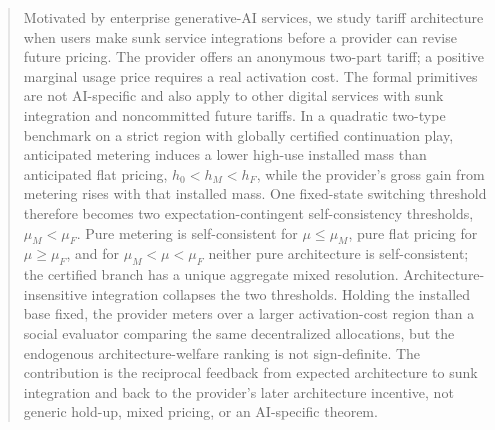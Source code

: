 \begin{abstract}
Motivated by enterprise generative-AI services, we study tariff architecture when users make sunk service integrations before a provider can revise future pricing. The provider offers an anonymous two-part tariff; a positive marginal usage price requires a real activation cost. The formal primitives are not AI-specific and also apply to other digital services with sunk integration and noncommitted future tariffs. In a quadratic two-type benchmark on a strict region with globally certified continuation play, anticipated metering induces a lower high-use installed mass than anticipated flat pricing, $h_0<h_M<h_F$, while the provider's gross gain from metering rises with that installed mass. One fixed-state switching threshold therefore becomes two expectation-contingent self-consistency thresholds, $\mu_M<\mu_F$. Pure metering is self-consistent for $\mu\leq\mu_M$, pure flat pricing for $\mu\geq\mu_F$, and for $\mu_M<\mu<\mu_F$ neither pure architecture is self-consistent; the certified branch has a unique aggregate mixed resolution. Architecture-insensitive integration collapses the two thresholds. Holding the installed base fixed, the provider meters over a larger activation-cost region than a social evaluator comparing the same decentralized allocations, but the endogenous architecture-welfare ranking is not sign-definite. The contribution is the reciprocal feedback from expected architecture to sunk integration and back to the provider's later architecture incentive, not generic hold-up, mixed pricing, or an AI-specific theorem.
\end{abstract}
